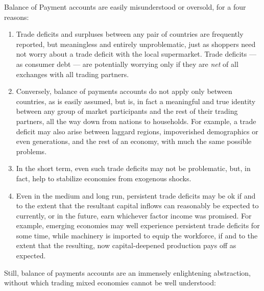 Balance of Payment accounts are easily misunderstood or oversold, for a four reasons:
\begin{enumerate}
	\item Trade deficits and surpluses between any pair of countries are frequently reported, but meaningless and entirely unproblematic, just as shoppers need not worry about a trade deficit with the local supermarket.
	Trade deficits --- as consumer debt --- are potentially worrying only if they are \emph{net} of all exchanges with all trading partners.

	\item Conversely, balance of payments accounts do not apply  only between countries, as is easily assumed, but is, in fact a meaningful and true identity between any group of market participants and the rest of their trading partners, all the way down from nations to households.
	For example, a trade deficit may also arise between laggard regions, impoverished demographics or even generations, and the rest of an economy, with much the same possible problems.

	\item In the short term, even such trade deficits may not be problematic, but, in fact, help to stabilize economies from exogenous shocks.

	\item Even in the medium and long run, persistent trade deficits may be ok if and to the extent that the resultant capital inflows can reasonably be expected to currently, or in the future, earn whichever factor income was promised.
	For example, emerging economies may well experience persistent trade deficits for some time, while machinery is imported to equip the workforce, if and to the extent that the resulting, now capital-deepened production pays off as expected.
\end{enumerate}

Still, balance of payments accounts are an immensely enlightening abstraction, without which trading mixed economies cannot be well understood:

